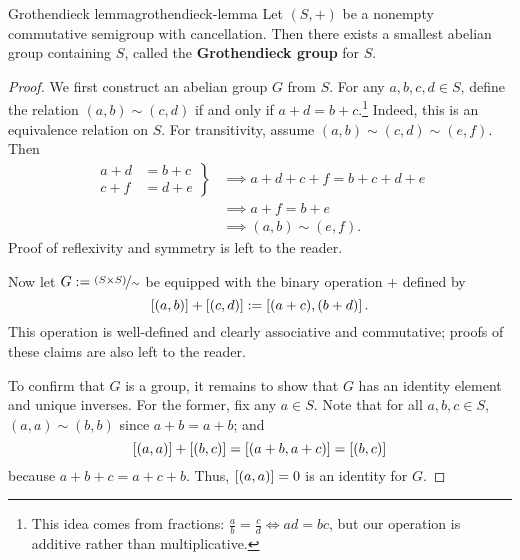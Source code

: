 \documentclass[master.tex]{subfiles}
\begin{document}
        \begin{lemma}{Grothendieck lemma}{grothendieck-lemma}
            Let $(S, +)$ be a nonempty commutative semigroup with cancellation.
            Then there exists a smallest abelian group containing $S$, called the \textbf{Grothendieck group} for $S$.
            \hr{}
            \begin{proof}
                We first construct an abelian group $G$ from $S$.
                For any $a, b, c, d \in S$, define the relation $(a, b) \sim (c, d)$ if and only if $a + d = b + c$.\footnote{
                    This idea comes from fractions: $\frac{a}{b} = \frac{c}{d} \iff ad = bc$, but our operation is additive rather than multiplicative.
                }
                Indeed, this is an equivalence relation on $S$.
                For transitivity, assume $(a, b) \sim (c, d) \sim (e, f)$.
                Then
                \begin{align*}
                    \left.\begin{aligned}
                        a + d &= b + c \\
                        c + f &= d + e
                    \end{aligned}\right\}
                    &\implies a + d + c + f = b + c + d + e \\
                    &\implies a + f = b + e \\
                    &\implies (a, b) \sim (e, f).
                \end{align*}
                Proof of reflexivity and symmetry is left to the reader.

                Now let $G := \nicefrac{(S \times S)}{\sim}$ be equipped with the binary operation $+$ defined by
                \[
                    \left[ (a, b) \right] + \left[ (c, d) \right] := \left[ (a + c), (b + d) \right]    
                .\]
                This operation is well-defined and clearly associative and commutative; proofs of these claims are also left to the reader.

                To confirm that $G$ is a group, it remains to show that $G$ has an identity element and unique inverses.
                For the former, fix any $a \in S$.
                Note that for all $a, b, c \in S$, $(a, a) \sim (b, b)$ since $a + b = a + b$; and
                \[
                    \left[ (a, a) \right] + \left[ (b, c) \right] = \left[ (a + b, a + c) \right] = \left[ (b, c) \right]  
                \]
                because $a + b + c = a + c + b$.
                Thus, $\left[ (a, a) \right] = 0$ is an identity for $G$.


\end{proof}
\end{lemma}
\end{document}
